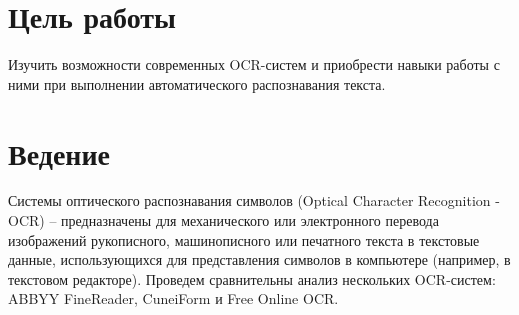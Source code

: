 	\section{Цель работы}
		Изучить возможности современных OCR-систем и приобрести навыки работы с ними при выполнении автоматического распознавания текста.
		
	\section{Ведение}
	Системы оптического распознавания символов (Optical Character Recognition - OCR) – предназначены для механического или электронного перевода изображений рукописного, машинописного или печатного текста в текстовые данные, использующихся для представления символов в компьютере (например, в текстовом редакторе).
	Проведем сравнительны анализ нескольких OCR-систем: ABBYY FineReader, CuneiForm и Free Online OCR.
	
